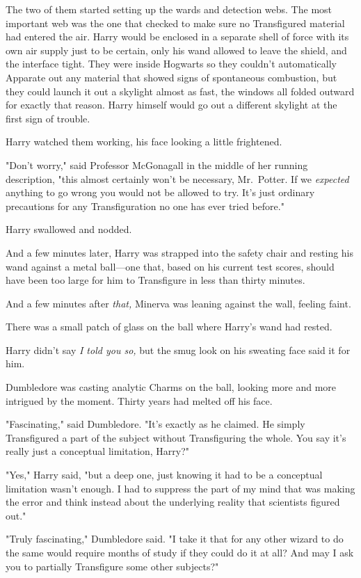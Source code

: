 The two of them started setting up the wards and detection webs. The most 
important web was the one that checked to make sure no Transfigured material 
had entered the air. Harry would be enclosed in a separate shell of force with 
its own air supply just to be certain, only his wand allowed to leave the 
shield, and the interface tight. They were inside Hogwarts so they couldn't 
automatically Apparate out any material that showed signs of spontaneous 
combustion, but they could launch it out a skylight almost as fast, the windows 
all folded outward for exactly that reason. Harry himself would go out a 
different skylight at the first sign of trouble.

Harry watched them working, his face looking a little frightened.

"Don't worry," said Professor McGonagall in the middle of her running 
description, "this almost certainly won't be necessary, Mr.~Potter. If we 
\emph{expected} anything to go wrong you would not be allowed to try. It's just 
ordinary precautions for any Transfiguration no one has ever tried before."

Harry swallowed and nodded.

And a few minutes later, Harry was strapped into the safety chair and resting 
his wand against a metal ball---one that, based on his current test scores, 
should have been too large for him to Transfigure in less than thirty minutes.

And a few minutes after \emph{that,} Minerva was leaning against the wall, 
feeling faint.

There was a small patch of glass on the ball where Harry's wand had rested.

Harry didn't say \emph{I told you so,} but the smug look on his sweating face 
said it for him.

Dumbledore was casting analytic Charms on the ball, looking more and more 
intrigued by the moment. Thirty years had melted off his face.

"Fascinating," said Dumbledore. "It's exactly as he claimed. He simply 
Transfigured a part of the subject without Transfiguring the whole. You say 
it's really just a conceptual limitation, Harry?"

"Yes," Harry said, "but a deep one, just knowing it had to be a conceptual 
limitation wasn't enough. I had to suppress the part of my mind that was making 
the error and think instead about the underlying reality that scientists 
figured out."

"Truly fascinating," Dumbledore said. "I take it that for any other wizard to 
do the same would require months of study if they could do it at all? And may I 
ask you to partially Transfigure some other subjects?"

